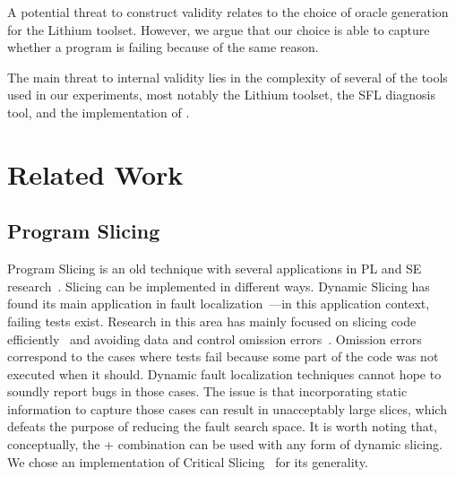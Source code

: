 \documentclass{article}
\begin{document}
A potential threat to construct validity relates to the choice of oracle generation
for the Lithium toolset. However, we argue that our choice is able to capture whether
a program is failing because of the same reason.

The main threat to internal validity lies in the complexity of several of the tools
used in our experiments, most notably the Lithium toolset, the SFL diagnosis tool,
and the implementation of \comb{}.
%
\section{Related Work}


\subsection{Program Slicing}

Program Slicing is an old technique with several applications in PL
and SE research~\cite{Weiser:1981:PS:800078.802557}. Slicing can be
implemented in different ways. Dynamic Slicing has found its main
application in fault
localization~\cite{Agrawal:1990:DPS:93542.93576}---in this application
context, failing tests exist. Research in this area has mainly focused
on slicing code
efficiently~\cite{Wang:2008:DSJ:1330017.1330021,Wang:2004:UCB:998675.999455}
and avoiding data and control omission
errors~\cite{Zhang:2007:TLE:1250734.1250782,Lin:2018:BDE:3238147.3238163}. Omission errors correspond to the
cases where tests fail because some part of the code was not executed
when it should. Dynamic fault localization techniques cannot hope to
soundly report bugs in those cases. The issue is that incorporating
static information to capture those cases can result in unacceptably
large slices, which defeats the purpose of reducing the fault search
space. It is worth noting that, conceptually, the \sfl{}+\ds{} combination
can be used with any form of dynamic slicing. We chose an
implementation of Critical
Slicing~\cite{DeMillo:1996:CSS:229000.226310} for its generality.
\end{document}
